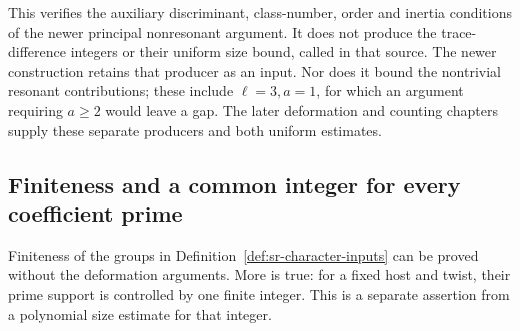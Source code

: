 This verifies the auxiliary discriminant, class-number, order and
inertia conditions of the newer principal nonresonant argument.
It does not produce the trace-difference integers or their uniform
size bound, called  in that source.
The newer construction retains that producer as an input.
Nor does it bound the nontrivial resonant contributions; these
include \(\ell=3,a=1\), for which an argument requiring \(a\geq2\)
would leave a gap.
The later deformation and counting chapters supply these separate
producers and both uniform estimates.

\subsection{Finiteness and a common integer for every coefficient prime}
\label{sec:sr-character-finiteness}
Finiteness of the groups in Definition~\ref{def:sr-character-inputs}
can be proved without the deformation arguments.
More is true: for a fixed host and twist, their prime support is
controlled by one finite integer.
This is a separate assertion from a polynomial size estimate for
that integer.

